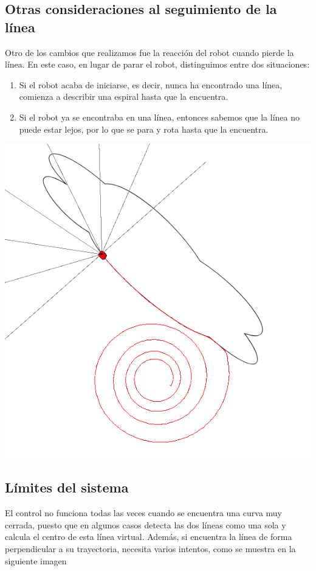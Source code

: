 \documentclass[11pt]{article}
\begin{document}
\subsection{Otras consideraciones al seguimiento de la línea}
\label{sec-1-3}
Otro de los cambios que realizamos fue la reacción del robot cuando pierde la línea. En este caso, en
lugar de parar el robot, distinguimos entre dos situaciones:
\begin{enumerate}
\item Si el robot acaba de iniciarse, es decir, nunca ha encontrado una línea, comienza a describir una espiral hasta que la encuentra.
\item Si el robot ya se encontraba en una línea, entonces sabemos que la línea no puede estar lejos, por lo que se para y rota hasta que la encuentra.
\end{enumerate}


\includegraphics[width=.9\linewidth]{../doc-images/espiral_nube.png}


\subsection{Límites del sistema}
\label{sec-1-4}
El control no funciona todas las veces cuando se encuentra una curva muy cerrada, puesto que en algunos
casos detecta las dos líneas como una sola y calcula el centro de esta línea virtual. Además, si encuentra
la línea de forma perpendicular a su trayectoria, necesita varios intentos, como se muestra en la siguiente
imagen
\end{document}
